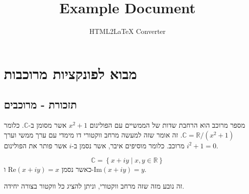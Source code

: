 \documentclass{tstextbook}
\begin{document}
\title{Example Document}
\author{HTML2LaTeX Converter}
\maketitle

\section{מבוא לפונקציות מרוכבות}

\subsection{תזכורת - מרוכבים}

מספר מרוכב הוא הרחבת שדות של הממשיים עם הפולינום \(x^2+1\) אשר מסומן ב-\(\mathbb{C}\). כלומר \(\mathbb{C}=\mathbb{R} / (x^2+1)\). זה אומר שזה למעשה מרחב ווקטורי דו מימדי עם ערך ממשי וערך מרוכב. כלומר מוסיפים איבר, אשר נסמן ב-\(i\) אשר פותר את הפולינום \(i^2+1=0\). 

\begin{proposition}
$$\mathbb{C}=\left\{  x+iy\mid x,y \in \mathbb{R}  \right\}$$
כאשר נסמן \(\mathrm{Re}(x+iy)=x\) ו-\(\mathrm{Im}(x+iy)=y\).

\end{proposition}
זה נובע מזה שזה מרחב ווקטורי, וניתן להציג כל ווקטור בצורה יחידה.
\end{document}
